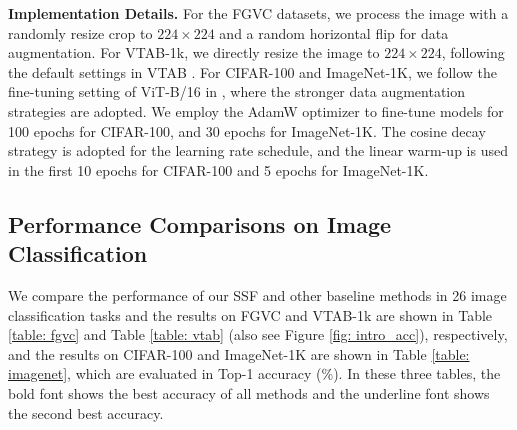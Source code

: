 \textbf{Implementation Details.} For the FGVC datasets, we process the image with a randomly resize crop to $224 \times 224$ and a random horizontal flip for data augmentation. For VTAB-1k, we directly resize the image to $224 \times 224$, following the default settings in VTAB \cite{zhai2019large}. For CIFAR-100 and ImageNet-1K, we follow the fine-tuning setting of ViT-B/16 in \cite{dosovitskiy2020image}, where the stronger data augmentation strategies are adopted. We employ the AdamW \cite{loshchilov2017decoupled} optimizer to fine-tune models for 100 epochs for CIFAR-100, and 30 epochs for ImageNet-1K. The cosine decay strategy is adopted for the learning rate schedule, and the linear warm-up is used in the first 10 epochs for CIFAR-100 and 5 epochs for ImageNet-1K. 

\subsection{Performance Comparisons on Image Classification}\label{sec: 4.2}

We compare the performance of our SSF and other baseline methods in 26 image classification tasks and the results on FGVC and VTAB-1k are shown in Table \ref{table: fgvc} and Table \ref{table: vtab} (also see Figure \ref{fig: intro_acc}), respectively, and the results on CIFAR-100 and ImageNet-1K are shown in Table \ref{table: imagenet}, which are evaluated in Top-1 accuracy (\%). In these three tables, the bold font shows the best accuracy of all methods and the underline font shows the second best accuracy. 

